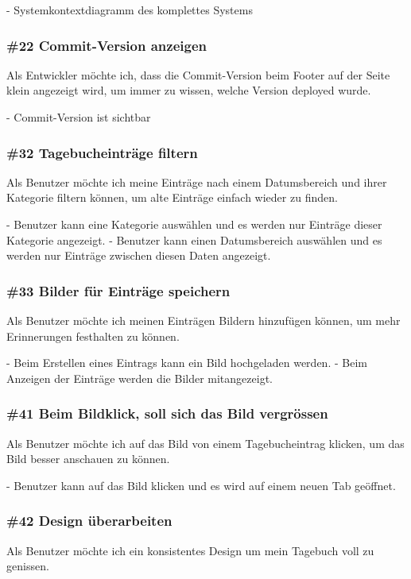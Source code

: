 \noindent
- Systemkontextdiagramm des komplettes Systems

\subsubsection*{\#22 Commit-Version anzeigen}
Als Entwickler möchte ich, dass die Commit-Version beim Footer auf der Seite klein angezeigt wird, um immer zu wissen, welche Version deployed wurde.

\noindent
- Commit-Version ist sichtbar


\subsubsection*{\#32 Tagebucheinträge filtern}
Als Benutzer möchte ich meine Einträge nach einem Datumsbereich und ihrer Kategorie filtern können, um alte Einträge einfach wieder zu finden.

\noindent
 - Benutzer kann eine Kategorie auswählen und es werden nur Einträge dieser Kategorie angezeigt.
 - Benutzer kann einen Datumsbereich auswählen und es werden nur Einträge zwischen diesen Daten angezeigt.

 \subsubsection*{\#33 Bilder für Einträge speichern}
 Als Benutzer möchte ich meinen Einträgen Bildern hinzufügen können, um mehr Erinnerungen festhalten zu können.

 \noindent
 - Beim Erstellen eines Eintrags kann ein Bild hochgeladen werden.
 - Beim Anzeigen der Einträge werden die Bilder mitangezeigt.

 \subsubsection*{\#41 Beim Bildklick, soll sich das Bild vergrössen}
 Als Benutzer möchte ich auf das Bild von einem Tagebucheintrag klicken, um das Bild besser anschauen zu können.

 \noindent
 - Benutzer kann auf das Bild klicken und es wird auf einem neuen Tab geöffnet.

 \subsubsection*{\#42 Design überarbeiten}
 Als Benutzer möchte ich ein konsistentes Design um mein Tagebuch voll zu genissen.

